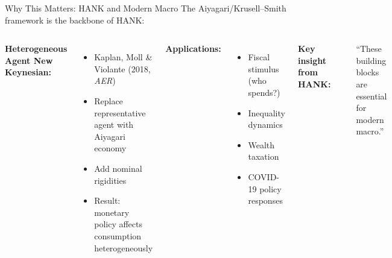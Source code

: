 \documentclass[aspectratio=169,11pt]{beamer}
\newcommand{\emphc}[1]{\textcolor{harvardcrimson}{#1}}
\begin{document}
\begin{frame}[shrink=2]{Why This Matters: HANK and Modern Macro}
\small
The Aiyagari/Krusell--Smith framework is the \emphc{backbone of HANK}:

\vspace{0.1em}
\begin{columns}[T]
\textbf{Heterogeneous Agent New Keynesian:}
\begin{itemize}\itemsep2pt
    \item Kaplan, Moll \& Violante (2018, \emph{AER})
    \item Replace representative agent with Aiyagari economy
    \item Add nominal rigidities
    \item Result: monetary policy affects consumption \emphc{heterogeneously}
\end{itemize}

\vspace{0.3em}
\textbf{Applications:}
\begin{itemize}\itemsep2pt
    \item Fiscal stimulus (who spends?)
    \item Inequality dynamics
    \item Wealth taxation
    \item COVID-19 policy responses
\end{itemize}

\textbf{Key insight from HANK:}

\vspace{0.2em}
\begin{center}
\end{center}

\vspace{0.1em}
{\scriptsize ``These building blocks are essential for modern macro.''}
\end{columns}
\end{frame}
\end{document}
